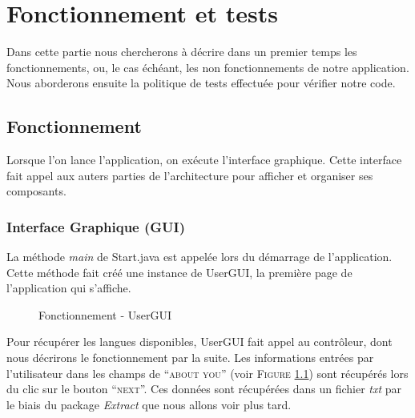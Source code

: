 \chapter{Fonctionnement et tests}

Dans cette partie nous chercherons à décrire dans un premier temps les fonctionnements, ou, le cas échéant, les non fonctionnements de notre application.  Nous aborderons ensuite la politique de tests effectuée pour vérifier notre code. 

\section{Fonctionnement}

Lorsque l'on lance l'application, on exécute l'interface graphique. Cette interface fait appel aux auters parties de l'architecture pour afficher et organiser ses composants.

\subsection{Interface Graphique (GUI)}\label{GUI}

La méthode \textit{main} de Start.java est appelée lors du démarrage de l'application. Cette méthode fait créé une instance de UserGUI, la première page de l'application qui s'affiche.

\begin{figure}[!ht]
\begin{center}
  \caption{Fonctionnement - UserGUI}
  \label{UserGUI} 
\end{center}
\end{figure}

Pour récupérer les langues disponibles, UserGUI fait appel au contrôleur, dont nous décrirons le fonctionnement par la suite.
Les informations entrées par l'utilisateur dans les champs de ``\textsc{about you}'' (voir \textsc{Figure} \ref{UserGUI}) sont récupérés lors du clic sur le bouton ``\textsc{next}''. Ces données sont récupérées dans un fichier \textit{txt} par le biais du package \textit{Extract} que nous allons voir plus tard.

